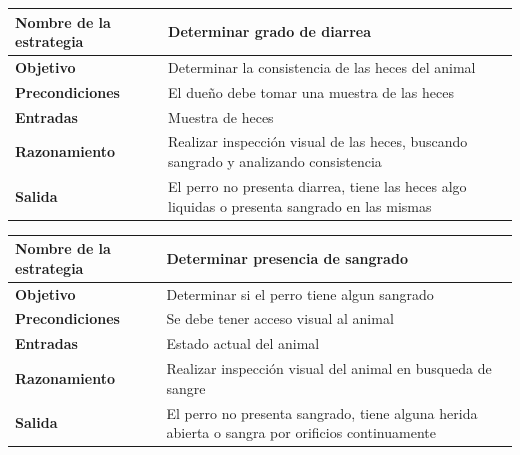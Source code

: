 \documentclass[a4paper,table,xcdraw]{article}
\begin{document}
\begin{longtable}{|m{100pt}|m{300pt}|}
\hline
\textbf{Nombre de la estrategia} & Determinar grado de diarrea                                                                   \\ \hline
\endhead
%
\textbf{Objetivo}                & Determinar la consistencia de las heces del animal                                            \\ \hline
\textbf{Precondiciones}          & El dueño debe tomar una muestra de las heces                                                  \\ \hline
\textbf{Entradas}                & Muestra de heces                                                                              \\ \hline
\textbf{Razonamiento}            & Realizar inspección visual de las heces, buscando sangrado y analizando consistencia          \\ \hline
\textbf{Salida}                  & El perro no presenta diarrea, tiene las heces algo liquidas o presenta sangrado en las mismas \\ \hline
\end{longtable}

\begin{longtable}{|m{100pt}|m{300pt}|}
\hline
\textbf{Nombre de la estrategia} & Determinar presencia de sangrado                                                                \\ \hline
\endhead
%
\textbf{Objetivo}                & Determinar si el perro tiene algun sangrado                                                     \\ \hline
\textbf{Precondiciones}          & Se debe tener acceso visual al animal                                                           \\ \hline
\textbf{Entradas}                & Estado actual del animal                                                                        \\ \hline
\textbf{Razonamiento}            & Realizar inspección visual del animal en busqueda de sangre                                     \\ \hline
\textbf{Salida}                  & El perro no presenta sangrado, tiene alguna herida abierta o sangra por orificios continuamente \\ \hline
\end{longtable}
\end{document}
